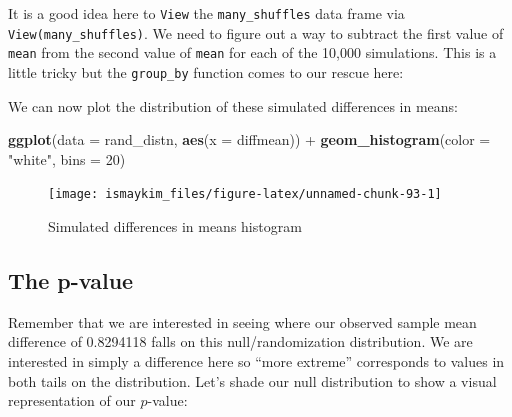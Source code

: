 \documentclass[]{tufte-book}
\newenvironment{Shaded}{\begin{snugshade}}{\end{snugshade}}
\newcommand{\KeywordTok}[1]{\textcolor[rgb]{0.13,0.29,0.53}{\textbf{{#1}}}}
\newcommand{\DataTypeTok}[1]{\textcolor[rgb]{0.13,0.29,0.53}{{#1}}}
\newcommand{\DecValTok}[1]{\textcolor[rgb]{0.00,0.00,0.81}{{#1}}}
\newcommand{\StringTok}[1]{\textcolor[rgb]{0.31,0.60,0.02}{{#1}}}
\newcommand{\NormalTok}[1]{{#1}}
\begin{document}
It is a good idea here to \texttt{View} the \texttt{many\_shuffles} data
frame via \texttt{View(many\_shuffles)}. We need to figure out a way to
subtract the first value of \texttt{mean} from the second value of
\texttt{mean} for each of the 10,000 simulations. This is a little
tricky but the \texttt{group\_by} function comes to our rescue here:

\begin{Shaded}
\end{Shaded}

We can now plot the distribution of these simulated differences in
means:

\begin{Shaded}
\begin{Highlighting}[]
\KeywordTok{ggplot}\NormalTok{(}\DataTypeTok{data =} \NormalTok{rand_distn, }\KeywordTok{aes}\NormalTok{(}\DataTypeTok{x =} \NormalTok{diffmean)) +}
\StringTok{  }\KeywordTok{geom_histogram}\NormalTok{(}\DataTypeTok{color =} \StringTok{"white"}\NormalTok{, }\DataTypeTok{bins =} \DecValTok{20}\NormalTok{)}
\end{Highlighting}
\end{Shaded}

\begin{figure}

{\centering \texttt{[image: ismaykim\_files/figure-latex/unnamed-chunk-93-1]} 

}

\caption[Simulated differences in means histogram]{Simulated differences in means histogram}\label{fig:unnamed-chunk-93}
\end{figure}

\subsection{The p-value}\label{the-p-value-1}

Remember that we are interested in seeing where our observed sample mean
difference of 0.8294118 falls on this null/randomization distribution.
We are interested in simply a difference here so ``more extreme''
corresponds to values in both tails on the distribution. Let's shade our
null distribution to show a visual representation of our \(p\)-value:
\end{document}
